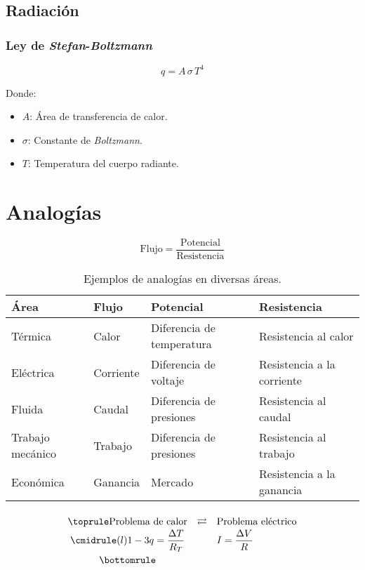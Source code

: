 \subsection{Radiación}

\subsubsection{Ley de \emph{Stefan}-\emph{Boltzmann}}
\begin{equation}
    q=A\,\sigma\,T^4
\label{radiacion}
\end{equation}

Donde:
\begin{itemize}
    \item \emph{$A$}: Área de transferencia de calor.
    \item \emph{$\sigma$}: Constante de \emph{Boltzmann}.
    \item \emph{$T$}: Temperatura del cuerpo radiante.
\end{itemize}

\section{Analogías}
\begin{equation}
    \text{Flujo}=\frac{\text{Potencial}}{\text{Resistencia}}
\label{analogias}
\end{equation}

\begin{table}[!h]
\begin{center}
\begin{tabular}{|>{\centering}m{2.0cm}<{\centering}
                |>{\centering}m{2.0cm}<{\centering}
                |>{\centering}m{3.6cm}<{\centering}
                |>{\centering}m{3.6cm}<{\centering}|}
\hline
\textbf{Área} & \textbf{Flujo} & \textbf{Potencial} & \textbf{Resistencia}
\tabularnewline \hline
Térmica & Calor & Diferencia de temperatura & Resistencia al calor
\tabularnewline \hline
Eléctrica & Corriente  & Diferencia de voltaje & Resistencia a la corriente
\tabularnewline \hline
Fluida & Caudal & Diferencia de presiones & Resistencia al caudal
\tabularnewline \hline
Trabajo mecánico & Trabajo & Diferencia de presiones & Resistencia al trabajo
\tabularnewline \hline
Económica & Ganancia & Mercado & Resistencia a la ganancia
\tabularnewline \hline
\end{tabular}
\caption{Ejemplos de analogías en diversas áreas.}
\label{cuadro1}
\end{center}
\end{table}

\begin{equation*}
\def\arraystretch{1.4}
\begin{array}{@{}cll@{}}
\toprule
\text{Problema de calor} & \rightleftarrows & \text{Problema eléctrico} \\
\cmidrule(l){1-3}
q=\dfrac{\Delta T}{R_T} & & I=\dfrac{\Delta V}{R} \\
\bottomrule
\end{array}
\end{equation*}

